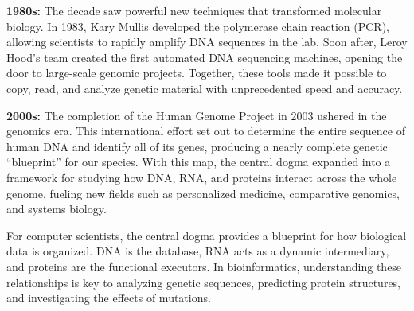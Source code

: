 \medskip\noindent\textbf{1980s:} The decade saw powerful new techniques that transformed molecular biology. In 1983, Kary Mullis developed the polymerase chain reaction (PCR), allowing scientists to rapidly amplify DNA sequences in the lab. Soon after, Leroy Hood’s team created the first automated DNA sequencing machines, opening the door to large-scale genomic projects. Together, these tools made it possible to copy, read, and analyze genetic material with unprecedented speed and accuracy.

\medskip\noindent\textbf{2000s:} The completion of the Human Genome Project in 2003 ushered in the genomics era. This international effort set out to determine the entire sequence of human DNA and identify all of its genes, producing a nearly complete genetic ``blueprint'' for our species. With this map, the central dogma expanded into a framework for studying how DNA, RNA, and proteins interact across the whole genome, fueling new fields such as personalized medicine, comparative genomics, and systems biology.

\bigskip\noindent
For computer scientists, the central dogma provides a blueprint for how biological data is organized. DNA is the database, RNA acts as a dynamic intermediary, and proteins are the functional executors. In bioinformatics, understanding these relationships is key to analyzing genetic sequences, predicting protein structures, and investigating the effects of mutations.